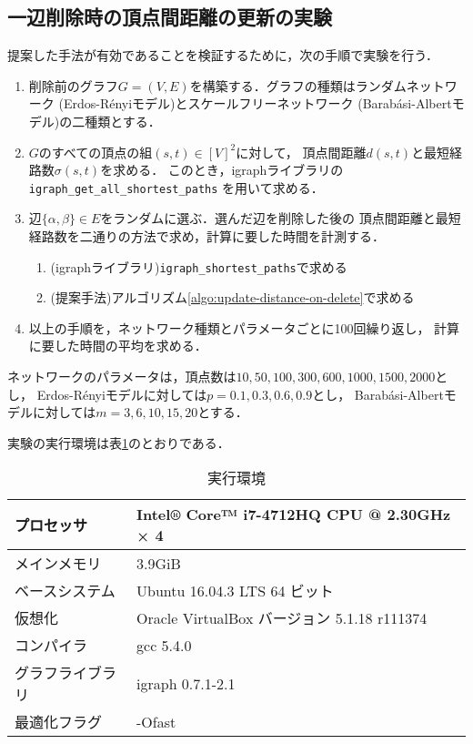 \subsection*{一辺削除時の頂点間距離の更新の実験}
提案した手法が有効であることを検証するために，次の手順で実験を行う．
\begin{enumerate}
\item 削除前のグラフ$G=(V,E)$を構築する．グラフの種類はランダムネットワーク
  (Erdos-R{\'e}nyiモデル)\cite{Erdos1959}とスケールフリーネットワーク
  (Barab{\'a}si-Albertモデル)\cite{Barabasi1999}の二種類とする．
\item $G$のすべての頂点の組$(s,t)\in[V]^2$に対して，
  頂点間距離$d(s,t)$と最短経路数$\sigma(s,t)$を求める．
  このとき，igraphライブラリの\verb|igraph_get_all_shortest_paths|
  を用いて求める．
\item 辺$\{\alpha,\beta\}\in E$をランダムに選ぶ．選んだ辺を削除した後の
  頂点間距離と最短経路数を二通りの方法で求め，計算に要した時間を計測する．
  \begin{enumerate}[a]
  \item (igraphライブラリ)\verb|igraph_shortest_paths|で求める
  \item (提案手法)アルゴリズム\ref{algo:update-distance-on-delete}で求める
  \end{enumerate}
\item 以上の手順を，ネットワーク種類とパラメータごとに100回繰り返し，
  計算に要した時間の平均を求める．
\end{enumerate}
ネットワークのパラメータは，頂点数は$10,50,100,300,600,1000,1500,2000$とし，
Erdos-R{\'e}nyiモデルに対しては$p=0.1,0.3,0.6,0.9$とし，
Barab{\'a}si-Albertモデルに対しては$m=3,6,10,15,20$とする．

実験の実行環境は表\ref{tab:env-mws}のとおりである．
\begin{table}
  \caption{実行環境}
  \label{tab:env-mws}
  \centering
  \begin{tabular}{ll}
    \hline
    プロセッサ & Intel® Core™ i7-4712HQ CPU @ 2.30GHz × 4 \\ \hline
    メインメモリ & 3.9GiB \\ \hline
    ベースシステム & Ubuntu 16.04.3 LTS 64 ビット \\ \hline
    仮想化 & Oracle VirtualBox バージョン 5.1.18 r111374 \\ \hline
    コンパイラ & gcc 5.4.0 \\ \hline
    グラフライブラリ & igraph 0.7.1-2.1 \\ \hline
    最適化フラグ & -Ofast \\ \hline
  \end{tabular}
\end{table}

